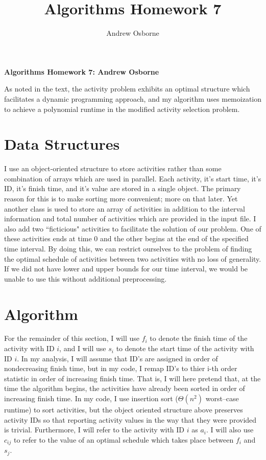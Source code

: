 \documentclass{article}
\author{Andrew Osborne}
\title{Algorithms Homework 7}
\begin{document}
  \begin{center}
    \textbf{Algorithms Homework 7: Andrew Osborne}
  \end{center} 

    
    As noted in the text, the activity problem exhibits an optimal structure 
    which facilitates a dynamic programming approach, and my algorithm 
    uses memoization to achieve a polynomial runtime in the modified 
    activity selection problem.
  \section*{Data Structures}

    I use an object-oriented structure to store activities rather than some 
    combination of arrays which are used in parallel. 
    Each activity, it's start time, it's ID, it's finish time, and it's value 
    are stored in a single object. 
    The primary reason for this is to make sorting more convenient; more on that 
    later.
    Yet another class is used to store an array of activities in addition to the 
    interval information and total number of activities which are provided in the 
    input file. 
    I also add two ``ficticious" activities to facilitate the solution of our problem.
    One of these activities ends at time $0$ and the other begins at the end
    of the specified time interval.
    By doing this, we can restrict ourselves to the problem of finding
    the optimal schedule of activities between two activities with no loss
    of generality. 
    If we did not have lower and upper bounds for our time interval,
    we would be unable to use this without additional preprocessing.

  \section*{Algorithm}
    For the remainder of this section, I will use $f_i$ to denote the finish
    time of the activity with ID $i$, and I will use $s_i$ to denote the start
    time of the activity with ID $i$.
    In my analysis, I will assume that ID's are assigned in order of nondecreasing
    finish time, but in my code, I remap ID's to thier i-th order statistic in
    order of increasing finish time.
    That is, I will here pretend that, at the time the algorithm begins, the 
    activities have already been sorted in order of increasing finish time.
    In my code, I use insertion sort ($\Theta(n^2)$ worst--case runtime)
    to sort activities, but the object oriented structure above preserves
    activity IDs so that reporting activity values in the way that they were 
    provided is trivial.
    Furthermore, I will refer to the activity with ID $i$ as $a_i$.
    I will also use $c_{ij}$ to refer to the value of an optimal schedule which 
    takes place between $f_i$ and $s_j$.
\end{document}
